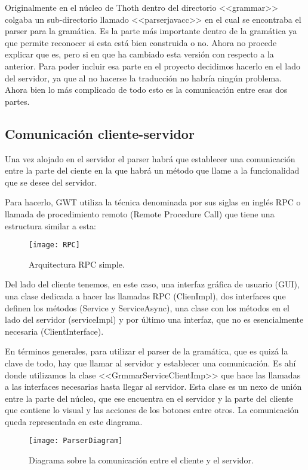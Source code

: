Originalmente en el núcleo de Thoth dentro del directorio <<grammar>> colgaba un sub-directorio llamado <<parserjavacc>> en el cual se encontraba el parser para la gramática. Es la parte más importante dentro de la gramática ya que permite reconocer si esta está bien construida o no.
Ahora no procede explicar que es, pero si en que ha cambiado esta versión con respecto a la anterior. 
Para poder incluir esa parte en el proyecto decidimos hacerlo en el lado del servidor, ya que al no hacerse la traducción no habría ningún problema. Ahora bien lo más complicado de todo esto es la comunicación entre esas dos partes.



\subsection{Comunicación cliente-servidor}
Una vez alojado en el servidor el parser habrá que establecer una comunicación entre la parte del ciente en la que habrá un método que llame a la funcionalidad que se desee del servidor.

Para hacerlo, GWT utiliza la técnica denominada por sus siglas en inglés RPC o llamada de procedimiento remoto (Remote Procedure Call) que tiene una estructura similar a esta: 

\begin{figure}[h]
\centering
\texttt{[image: RPC]}
\caption{Arquitectura RPC simple.}
\label{fig:5.1}
\end{figure}

Del lado del cliente tenemos, en este caso, una interfaz gráfica de usuario (GUI), una clase dedicada a hacer las llamadas RPC (ClienImpl), dos interfaces que definen los métodos (Service y ServiceAsync), una clase con los métodos en el lado del servidor (serviceImpl) y por último una interfaz, que no es esencialmente necesaria (ClientInterface). 

En términos generales, para utilizar el parser de la gramática, que es quizá la clave de todo, hay que llamar al servidor y establecer una comunicación. Es ahí donde utilizamos la clase <<GrmmarServiceClientImp>> que hace las llamadas a las interfaces necesarias hasta llegar al servidor. Esta clase es un nexo de unión entre la parte del núcleo, que ese encuentra en el servidor y la parte del cliente que contiene lo visual y las acciones de los botones entre otros. La comunicación queda representada en este diagrama.

\begin{figure}[h]
\centering
\texttt{[image: ParserDiagram]}
\caption{Diagrama sobre la comunicación entre el cliente y el servidor.}
\label{fig:5.1}
\end{figure}

